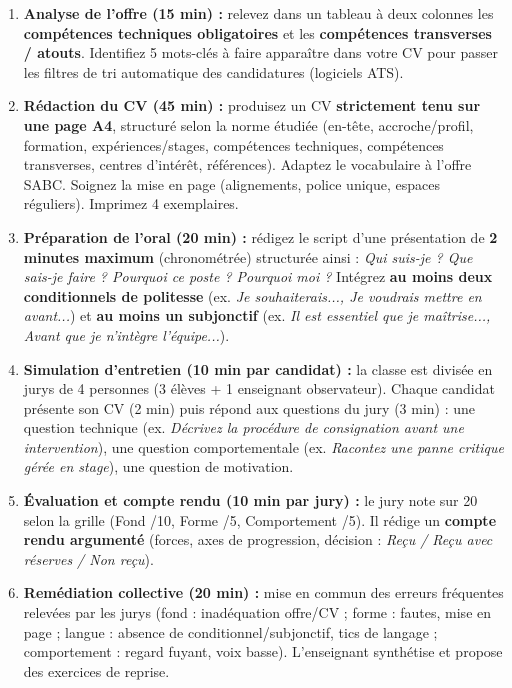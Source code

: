 \documentclass[11pt]{article}
\begin{document}
\begin{enumerate}
    \item \textbf{Analyse de l'offre (15 min) :} relevez dans un tableau à deux colonnes les \textbf{compétences techniques obligatoires} et les \textbf{compétences transverses / atouts}. Identifiez 5 mots-clés à faire apparaître dans votre CV pour passer les filtres de tri automatique des candidatures (logiciels ATS).
    \item \textbf{Rédaction du CV (45 min) :} produisez un CV \textbf{strictement tenu sur une page A4}, structuré selon la norme étudiée (en-tête, accroche/profil, formation, expériences/stages, compétences techniques, compétences transverses, centres d'intérêt, références). Adaptez le vocabulaire à l'offre SABC. Soignez la mise en page (alignements, police unique, espaces réguliers). Imprimez 4 exemplaires.
    \item \textbf{Préparation de l'oral (20 min) :} rédigez le script d'une présentation de \textbf{2 minutes maximum} (chronométrée) structurée ainsi : \emph{Qui suis-je ? Que sais-je faire ? Pourquoi ce poste ? Pourquoi moi ?} Intégrez \textbf{au moins deux conditionnels de politesse} (ex. \emph{Je souhaiterais..., Je voudrais mettre en avant...}) et \textbf{au moins un subjonctif} (ex. \emph{Il est essentiel que je maîtrise..., Avant que je n'intègre l'équipe...}).
    \item \textbf{Simulation d'entretien (10 min par candidat) :} la classe est divisée en jurys de 4 personnes (3 élèves + 1 enseignant observateur). Chaque candidat présente son CV (2 min) puis répond aux questions du jury (3 min) : une question technique (ex. \emph{Décrivez la procédure de consignation avant une intervention}), une question comportementale (ex. \emph{Racontez une panne critique gérée en stage}), une question de motivation.
    \item \textbf{Évaluation et compte rendu (10 min par jury) :} le jury note sur 20 selon la grille (Fond /10, Forme /5, Comportement /5). Il rédige un \textbf{compte rendu argumenté} (forces, axes de progression, décision : \emph{Reçu / Reçu avec réserves / Non reçu}).
    \item \textbf{Remédiation collective (20 min) :} mise en commun des erreurs fréquentes relevées par les jurys (fond : inadéquation offre/CV ; forme : fautes, mise en page ; langue : absence de conditionnel/subjonctif, tics de langage ; comportement : regard fuyant, voix basse). L'enseignant synthétise et propose des exercices de reprise.
\end{enumerate}
\end{document}
